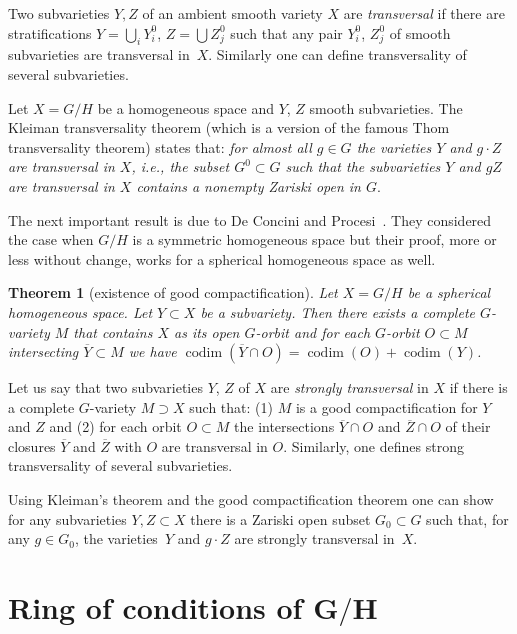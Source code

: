 \documentclass[10pt,a4paper]{amsart}
\def \codim{\operatorname{codim}}
\numberwithin{equation}{section}
\newtheorem{Th}{Theorem}[section]
\theoremstyle{definition}
\begin{document}
Two subvarieties $Y,Z$ of an ambient smooth variety $X$ are {\it transversal} if there are stratifications $Y=\bigcup_i Y_i^0$, $Z=\bigcup Z_j^0$ such that any pair $Y_i^0$, $Z_j^0$ of smooth subvarieties are transversal in~$X$. Similarly one can define transversality of several subvarieties.

Let $X = G/H$ be a homogeneous space and $Y$, $Z$ smooth subvarieties. The Kleiman transversality theorem (which is a version of the famous Thom transversality theorem) states that: \emph{for almost all $g\in G$ the varieties $Y$ and $g \cdot Z$ are transversal in $X$, i.e., the subset $G^0\subset G$ such that the subvarieties $Y$ and $gZ$ are transversal in $X$ contains a nonempty Zariski open in $G$}.

The next important result is due to De Concini and Procesi~\cite{DP}. They considered the case when $G/H$ is a symmetric homogeneous space but their proof, more or less without change, works for a spherical homogeneous space as well.
\begin{Th}[existence of good compactification] \label{th-exist-good-comp}
Let $X=G/H$ be a spherical homogeneous space. Let $Y \subset X$ be a subvariety. Then there exists a complete $G$-variety $M$ that contains $X$ as its open $G$-orbit and for each $G$-orbit $O\subset M$ intersecting $\overline{Y} \subset M$ we have $\codim(\overline{Y}\cap O) = \codim(O) + \codim(Y)$.
\end{Th}

Let us say that two subvarieties $Y$, $Z$ of $X$ are {\it strongly transversal} in $X$ if there is a complete $G$-variety $M\supset X$ such that: (1) $M$ is a good compactification for $Y$ and $Z$ and (2) for each orbit $O\subset M$ the intersections $\overline Y\cap O$ and $\overline Z\cap O$ of their closures $\overline Y$ and $\overline Z$ with $O$ are transversal in $O$. Similarly, one defines strong transversality of several subvarieties.

Using Kleiman's theorem and the good compactification theorem one can show for any subvarieties $Y,Z\subset X$ there is a Zariski open subset $G_0\subset G$ such that, for any $g \in G_0$, the varieties~$Y$ and $g \cdot Z$ are strongly transversal in~$X$.

\section[Ring of conditions of $G/H$]{Ring of conditions of $\boldsymbol{G/H}$} \label{sec-ring-of-conditions}
\end{document}
